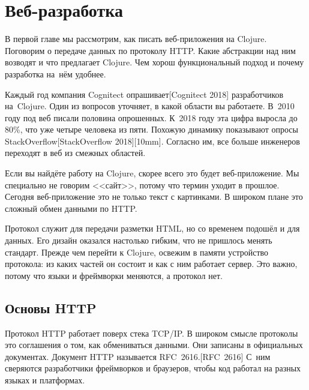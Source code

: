 \chapter{Веб-разработка}

\begin{teaser}
В первой главе мы рассмотрим, как писать веб-приложения на Clojure. Поговорим о
передаче данных по протоколу HTTP. Какие абстракции над ним возводят и что
предлагает Clojure. Чем хорош функциональный подход и почему разработка на~нём
удобнее.
\end{teaser}


Каждый год компания Cognitect
опрашивает[Cognitect 2018]
разработчиков на~Clojure. Один из вопросов уточняет, в какой области вы
работаете. В~2010 году под веб писали половина опрошенных. К~2018 году эта цифра
выросла до 80\%, что уже четыре человека из пяти. Похожую динамику показывают
опросы StackOverflow[Stack\-Overflow 2018][10mm].
Согласно им, все больше инженеров переходят в веб из смежных областей.

Если вы найдёте работу на Clojure, скорее всего это будет веб-приложение. Мы
специально не говорим <<сайт>>, потому что термин уходит в прошлое. Сегодня
веб-приложение это не только текст с картинками. В широком плане это сложный
обмен данными по HTTP.

Протокол служит для передачи разметки HTML, но со временем подошёл и для
данных. Его дизайн оказался настолько гибким, что не пришлось менять
стандарт. Прежде чем перейти к Clojure, освежим в памяти устройство протокола:
из каких частей он состоит и как с ним работает сервер. Это важно, потому что
языки и фреймворки меняются, а протокол нет.

\section{Основы HTTP}


Протокол HTTP работает поверх стека TCP/IP. В широком смысле протоколы это
соглашения о том, как обмениваться данными. Они записаны в официальных
документах. Документ HTTP называется RFC~2616.[RFC~2616]
С~ним сверяются разработчики фреймворков и браузеров, чтобы код работал
на разных языках и платформах.

